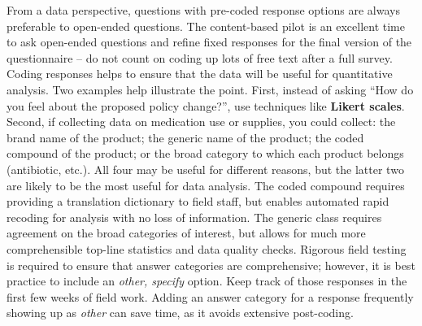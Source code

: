 From a data perspective, questions with pre-coded response options
are always preferable to open-ended questions.
The content-based pilot is an excellent time to ask open-ended questions
and refine fixed responses for the final version of the questionnaire --
do not count on coding up lots of free text after a full survey.
Coding responses helps to ensure that the data will be useful for quantitative analysis.
Two examples help illustrate the point.
First, instead of asking ``How do you feel about the proposed policy change?'',
use techniques like \textbf{Likert scales}.
Second, if collecting data on medication use or supplies, you could collect:
the brand name of the product; the generic name of the product; the coded compound of the product;
or the broad category to which each product belongs (antibiotic, etc.).
All four may be useful for different reasons,
but the latter two are likely to be the most useful for data analysis.
The coded compound requires providing a translation dictionary to field staff,
but enables automated rapid recoding for analysis with no loss of information.
The generic class requires agreement on the broad categories of interest,
but allows for much more comprehensible top-line statistics and data quality checks.
Rigorous field testing is required to ensure that answer categories are comprehensive;
however, it is best practice to include an \textit{other, specify} option.
Keep track of those responses in the first few weeks of field work.
Adding an answer category for a response frequently showing up as \textit{other} can save time,
as it avoids extensive post-coding.

